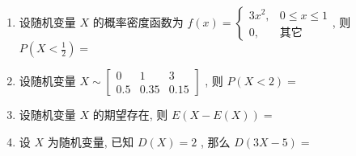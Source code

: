 \begin{enumerate}
	\item 设随机变量 $X$ 的概率密度函数为 $f(x)=
	\begin{cases}
	3x^2, & 0\leq x\leq 1\\
	0, & \text{其它}
	\end{cases}
	$, 则$ P\left(X<\frac{1}{2}\right)=$
	
	\underline{\hspace{8pc}}

	\item 设随机变量 $X\sim
	\begin{bmatrix}
	0 & 1 & 3\\
	0.5 & 0.35 & 0.15
	\end{bmatrix}
	$ , 则 $P(X<2)=$\underline{\hspace{8pc}}
	
	\item 设随机变量 $X$ 的期望存在, 则 $E(X-E(X))=$\underline{\hspace{8pc}}
	
	\item 设 $X$ 为随机变量, 已知 $D(X)=2$ , 那么 $D(3X-5)=$\underline{\hspace{8pc}}
 \end{enumerate}

